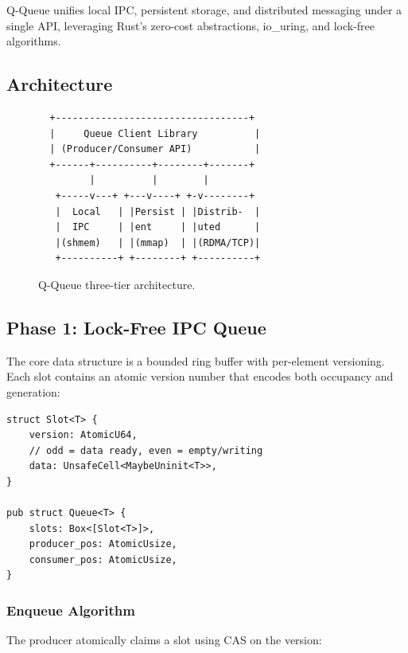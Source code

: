 \documentclass[11pt,a4paper,twocolumn]{article}
\begin{document}
Q-Queue unifies local IPC, persistent storage, and distributed messaging under a single API, leveraging Rust's zero-cost abstractions, io\_uring, and lock-free algorithms.

\subsection{Architecture}

\begin{figure}[H]
\centering
\begin{verbatim}
  +----------------------------------+
  |     Queue Client Library          |
  | (Producer/Consumer API)           |
  +------+----------+--------+-------+
         |          |        |
   +-----v---+ +---v----+ +-v--------+
   |  Local   | |Persist | |Distrib-  |
   |  IPC     | |ent     | |uted      |
   |(shmem)   | |(mmap)  | |(RDMA/TCP)|
   +----------+ +--------+ +----------+
\end{verbatim}
\caption{Q-Queue three-tier architecture.}
\end{figure}

\subsection{Phase 1: Lock-Free IPC Queue}

The core data structure is a bounded ring buffer with per-element versioning. Each slot contains an atomic version number that encodes both occupancy and generation:

\begin{lstlisting}
struct Slot<T> {
    version: AtomicU64,
    // odd = data ready, even = empty/writing
    data: UnsafeCell<MaybeUninit<T>>,
}

pub struct Queue<T> {
    slots: Box<[Slot<T>]>,
    producer_pos: AtomicUsize,
    consumer_pos: AtomicUsize,
}
\end{lstlisting}

\subsubsection{Enqueue Algorithm}

The producer atomically claims a slot using CAS on the version:
\end{document}
